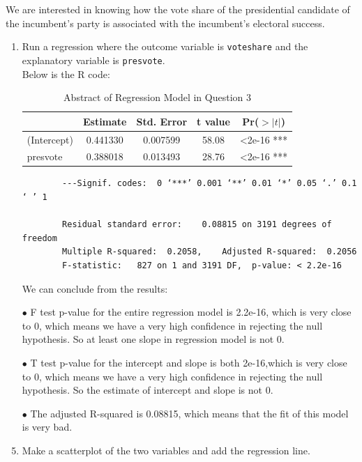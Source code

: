 \documentclass[12pt,letterpaper]{article}
\begin{document}
\noindent We are interested in knowing how the vote share of the presidential candidate of the incumbent's party is associated with the incumbent's electoral success.
	\vspace{.25cm}
	\begin{enumerate}
		\item Run a regression where the outcome variable is \texttt{voteshare} and the explanatory variable is \texttt{presvote}. \\
		
		Below is the R code:
		
		
		\begin{table}[ht]
			\centering
			\caption{Abstract of Regression Model in Question 3}
			\begin{tabular}{lcccc}
				\toprule
				& Estimate & Std. Error & t value & Pr($>|t|$) \\
				\midrule
				(Intercept) & 0.441330 &0.007599 & 58.08 & <2e-16 *** \\
				presvote & 0.388018 & 0.013493 & 28.76 & <2e-16 *** \\
				\bottomrule
			\end{tabular} 
		\end{table}
		\begin{verbatim}
		---Signif. codes:  0 ‘***’ 0.001 ‘**’ 0.01 ‘*’ 0.05 ‘.’ 0.1 ‘ ’ 1
		
		Residual standard error: 	0.08815 on 3191 degrees of freedom
		Multiple R-squared:  0.2058,	Adjusted R-squared:  0.2056 
		F-statistic:   827 on 1 and 3191 DF,  p-value: < 2.2e-16
		\end{verbatim}
		We can conclude from the results:
		\item[$\bullet$] F test p-value for the entire regression model is 2.2e-16, which is very close to 0, which means we have a very high confidence in rejecting the null hypothesis. So at least one slope in regression model is not 0.
		\item[$\bullet$] T test p-value for the intercept and slope is both 2e-16,which is very close to 0, which means we have a very high confidence in rejecting the null hypothesis. So the estimate of intercept and slope is not 0.
		\item[$\bullet$] The adjusted R-squared is 0.08815, which means that the fit of this model is very bad.
		
		\newpage
		
		\item Make a scatterplot of the two variables and add the regression line. 
		

\end{enumerate}
\end{document}
